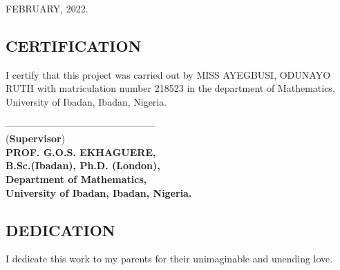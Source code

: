 \documentclass[a4 paper, 12pt]{report}
\theoremstyle{plain}
\begin{document}
\begin{center}
	FEBRUARY, 2022.
\end{center}
\newpage
\begin{center}
	\section*{CERTIFICATION} 
\end{center}
I certify that this project was carried out by  MISS AYEGBUSI, ODUNAYO RUTH with matriculation number 218523 in the department of Mathematics, University of Ibadan, Ibadan, Nigeria.\\
\begin{center}
	-----------------------------------------------\\
	(\textbf{Supervisor})\\
	\textbf{PROF. G.O.S. EKHAGUERE,}\\
	\textbf{B.Sc.(Ibadan), Ph.D. (London),}\\
	\textbf{Department of Mathematics,}\\
	\textbf{University of Ibadan, Ibadan, Nigeria.} 
\end{center}

\newpage
\begin{center}
	\section*{DEDICATION}
\end{center}
\noindent
\par I dedicate this work to my parents for their unimaginable and unending love.

\end{document}
